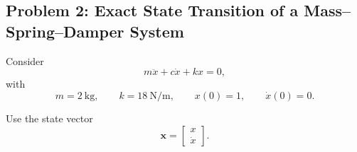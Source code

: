 \subsection*{Problem 2: Exact State Transition of a Mass--Spring--Damper System}

Consider
\begin{equation}
m\ddot{x}+c\dot{x}+kx=0,
\end{equation}
with
\begin{equation}
m=2~\mathrm{kg},
\qquad
k=18~\mathrm{N/m},
\qquad
x(0)=1,
\qquad
\dot{x}(0)=0.
\end{equation}

Use the state vector
\begin{equation}
\mathbf{x}
=
\begin{bmatrix}
x\\
\dot{x}
\end{bmatrix}.
\end{equation}

